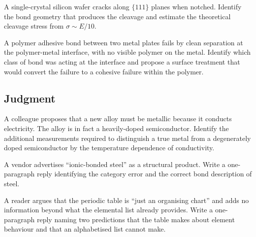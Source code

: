 \begin{exercise}
A single-crystal silicon wafer cracks along $\{111\}$ planes when
notched. Identify the bond geometry that produces the cleavage and
estimate the theoretical cleavage stress from $\sigma \sim E/10$.
\end{exercise}

\begin{exercise}
A polymer adhesive bond between two metal plates fails by clean
separation at the polymer-metal interface, with no visible polymer
on the metal. Identify which class of bond was acting at the
interface and propose a surface treatment that would convert the
failure to a cohesive failure within the polymer.
\end{exercise}

\subsection*{Judgment}

\begin{exercise}
A colleague proposes that a new alloy must be metallic because it
conducts electricity. The alloy is in fact a heavily-doped
semiconductor. Identify the additional measurements required to
distinguish a true metal from a degenerately doped semiconductor by
the temperature dependence of conductivity.
\end{exercise}

\begin{exercise}
A vendor advertises ``ionic-bonded steel'' as a structural product.
Write a one-paragraph reply identifying the category error and the
correct bond description of steel.
\end{exercise}

\begin{exercise}
A reader argues that the periodic table is ``just an organising
chart'' and adds no information beyond what the elemental list
already provides. Write a one-paragraph reply naming two predictions
that the table makes about element behaviour and that an
alphabetised list cannot make.
\end{exercise}
